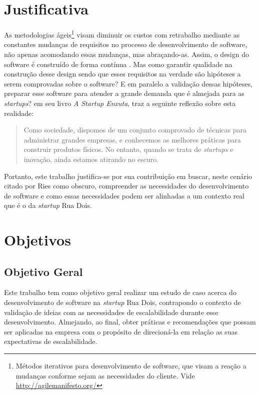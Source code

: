 \section{Justificativa}

As metodologias ágeis\footnote{Métodos iterativos para desenvolvimento de software,
que visam a reação a mudanças conforme sejam as necessidades do cliente. Vide
\url{http://agilemanifesto.org/}} visam diminuir os custos com retrabalho mediante as
constantes mudanças de requisitos no processo de desenvolvimento de software,
não apenas acomodando essas mudanças, mas abraçando-as. Assim, o design do
software é construído de forma contínua \cite{AgileSoftwareInnovation}.
Mas como garantir qualidade na construção desse design sendo que esses requisitos
na verdade são hipóteses a serem comprovadas sobre o software? E em paralelo
a validação dessas hipóteses, preparar esse software para atender a grande
demanda que é almejada para as \textit{startups}? 
em seu livro \textit{A Startup Enxuta}, traz a seguinte reflexão sobre esta
realidade:

  \begin{quotation}
    Como sociedade, dispomos de um conjunto comprovado de técnicas para
    administrar grandes empresas, e conhecemos as melhores práticas para
    construir produtos físicos. No entanto, quando se trata de \textit{startups}
    e inovação, ainda estamos atirando no escuro.
  \end{quotation}

Portanto, este trabalho justifica-se por sua contribuição em buscar, neste
cenário citado por Ries como obscuro, compreender as necessidades do desenvolvimento
de software e como essas necessidades podem ser alinhadas a um contexto real
que é o da \textit{startup} Rua Dois.

\section{Objetivos}

\subsection{Objetivo Geral}

Este trabalho tem como objetivo geral realizar um estudo de caso acerca do
desenvolvimento de software na \textit{startup} Rua Dois, contrapondo o contexto de
validação de ideias com as necessidades de escalabilidade durante esse
desenvolvimento. Almejando, ao final, obter práticas e recomendações que possam
ser aplicadas na empresa com o propósito de direcioná-la em relação as suas
expectativas de escalabilidade.

